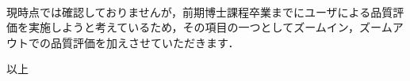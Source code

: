 \begin{qanda}
\item {}\\
現時点では確認しておりませんが，前期博士課程卒業までにユーザによる品質評価を実施しようと考えているため，その項目の一つとしてズームイン，ズームアウトでの品質評価を加えさせていただきます．

\end{qanda}

\begin{flushright}
{\large
以上
}
\end{flushright}

\renewcommand\submisson{\relax}
\renewcommand\affiliation{\relax}
\renewcommand\thesistitle{\relax}
\renewcommand\studentid{\relax}
\renewcommand\myname{\relax}
\renewcommand\q{\relax}
